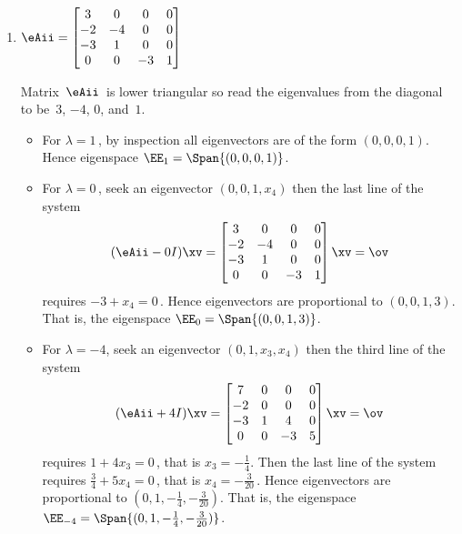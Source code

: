 \begin{example}
\begin{enumerate}
\item \(\eAii=\begin{bmatrix}3&0&0&0
\\-2&-4&0&0
\\-3&1&0&0
\\0&0&-3&1 \end{bmatrix}\)
\begin{solution} 
Matrix~\(\eAii\)\ is lower triangular so read the eigenvalues from the diagonal to be~\(3\), \(-4\), \(0\), and~\(1\).
\begin{itemize}
\item For \(\lambda=1\)\,, by inspection all eigenvectors are of the form \((0,0,0,1)\).
Hence eigenspace \(\EE_{1}=\Span\{(0,0,0,1)\}\).

\item For \(\lambda=0\)\,, seek an eigenvector \((0,0,1,x_4)\) then the last line of the system
\begin{equation*}
(\eAii-0I)\xv=
\begin{bmatrix}3&0&0&0
\\-2&-4&0&0
\\-3&1&0&0
\\0&0&-3&1 \end{bmatrix}\xv=\ov
\end{equation*}
requires \(-3+x_4=0\)\,.  
Hence eigenvectors are proportional to \((0,0,1,3)\).
That is, the eigenspace \(\EE_{0}=\Span\{(0,0,1,3)\}\).

\item For \(\lambda=-4\), seek an eigenvector \((0,1,x_3,x_4)\) then the third line of the system
\begin{equation*}
(\eAii+4I)\xv=
\begin{bmatrix}7&0&0&0
\\-2&0&0&0
\\-3&1&4&0
\\0&0&-3&5 \end{bmatrix}\xv=\ov
\end{equation*}
requires \(1+4x_3=0\)\,, that is \(x_3=-\frac14\).
Then the last line of the system requires \(\frac34+5x_4=0\)\,, that is \(x_4=-\frac3{20}\)\,. 
Hence eigenvectors are proportional to \((0,1,-\frac14,-\frac3{20})\).
That is, the eigenspace \(\EE_{-4}=\Span\{(0,1,-\frac14,-\frac3{20})\}\).


\end{itemize}
\end{solution}
\end{enumerate}
\end{example}
